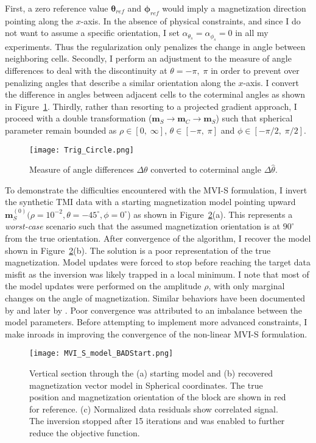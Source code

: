 First, a zero reference value $\boldsymbol \theta_{ref}$ and $\boldsymbol \phi_{ref}$ would imply a magnetization direction pointing along the $x$-axis. In the absence of physical constraints, and since I do not want to assume a specific orientation, I set $\alpha_{\theta_s}=\alpha_{\phi_s} = 0$ in all my experiments. Thus the regularization only penalizes the change in angle between neighboring cells. Secondly, I perform an adjustment to the measure of angle differences to deal with the discontinuity at $\theta = -\pi,\; \pi$ in order to prevent over penalizing angles that describe a similar orientation along the $x$-axis. I convert the difference in angles between adjacent cells to the coterminal angles as shown in Figure~\ref{Trig_Circle}. Thirdly, rather than resorting to a projected gradient approach, I proceed with a double transformation ($\mathbf{m}_S \rightarrow \mathbf{m}_C \rightarrow \mathbf{m}_S$) such that spherical parameter remain bounded as $\rho \in [0,\; \infty]$, $\theta \in [-\pi,\; \pi]$ and $\phi \in [-\pi/2,\; \pi/2]$.
\begin{figure}[h!]\centering
\texttt{[image: Trig\_Circle.png]}
\caption{Measure of angle differences $\Delta \theta$ converted to coterminal angle $\Delta\hat  \theta$.}
\label{Trig_Circle}
\end{figure}

To demonstrate the difficulties encountered with the MVI-S formulation, I invert the synthetic TMI data with a starting magnetization model pointing upward $\mathbf{m}_S^{(0)}(\rho=10^{-2}, \theta=-45^{\circ}, \phi=0^{\circ}$) as shown in Figure~\ref{MVI_S_model_noScale}(a). This represents a \emph{worst-case} scenario such that the assumed magnetization orientation is at $90^\circ$ from the true orientation.
After convergence of the algorithm, I recover the model shown in Figure~\ref{MVI_S_model_noScale}(b). The solution is a poor representation of the true magnetization. Model updates were forced to stop before reaching the target data misfit as the inversion was likely trapped in a local minimum. I note that most of the model updates were performed on the amplitude $\rho$, with only marginal changes on the angle of magnetization. Similar behaviors have been documented by \cite{LelievreOldenburg2009} and later by \cite{Liu2017}. Poor convergence was attributed to an imbalance between the model parameters. Before attempting to implement more advanced constraints, I make inroads in improving the convergence of the non-linear MVI-S formulation.
\begin{figure}[h!]
\texttt{[image: MVI\_S\_model\_BADStart.png]}
\caption{ Vertical section through the (a) starting model and (b) recovered magnetization vector model in Spherical coordinates. The true position and magnetization orientation of the block are shown in red for reference. (c) Normalized data residuals show correlated signal. The inversion stopped after 15 iterations and was enabled to further reduce the objective function.}
\label{MVI_S_model_noScale}
\end{figure}

